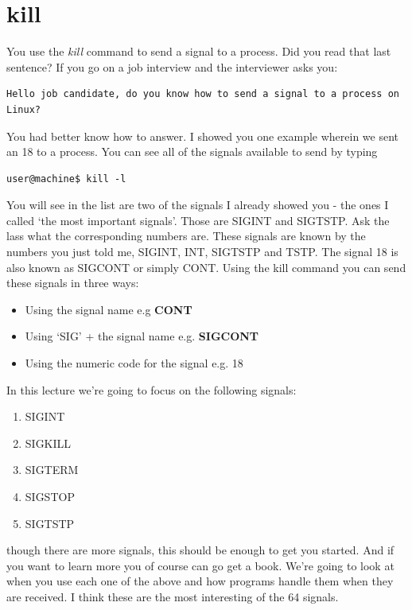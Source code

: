\documentclass[8pt]{article}
\begin{document}
\section{ kill }
You use the \textit{kill} command to send a signal to a process. Did you read
that last sentence? If you go on a job interview and the interviewer asks you:

\begin{verbatim}
Hello job candidate, do you know how to send a signal to a process on Linux?
\end{verbatim}

You had better know how to answer. I showed you one example wherein we sent an 18 to a process. You can see all of the signals available to send by typing 

\begin{lstlisting}
user@machine$ kill -l
\end{lstlisting}

You will see in the list are two of the signals I already showed you - the ones
I called `the most important signals'. Those are SIGINT and  SIGTSTP. Ask the
lass what the corresponding numbers are. These signals are known by the numbers
you just told me, SIGINT, INT, SIGTSTP and TSTP. The signal
18 is also known as SIGCONT or simply CONT. 
Using the kill command you can send these signals in three ways:

\begin{itemize}
\item Using the signal name e.g \textbf{CONT}
\item Using `SIG' + the signal name e.g. \textbf{SIGCONT}
\item Using the numeric code for the signal e.g. 18
\end{itemize}

In this lecture we're going to focus on the following signals:

\begin{enumerate}
\item SIGINT
\item SIGKILL
\item SIGTERM
\item SIGSTOP
\item SIGTSTP
\end{enumerate}

though there are more signals, this should be enough to get you started. And if you want to learn more you of course can go get a book. We're going to look at when you use each one of the above and how programs handle them when they are received. I think these are the most interesting of the 64 signals.
\end{document}
